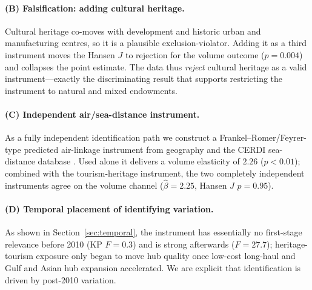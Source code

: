 \paragraph{(B) Falsification: adding cultural heritage.} Cultural heritage
co-moves with development and historic urban and manufacturing centres, so it
is a plausible exclusion-violator. Adding it as a third instrument moves the
Hansen $J$ to rejection for the volume outcome ($p=0.004$) and collapses the
point estimate. The data thus \emph{reject} cultural heritage as a valid
instrument---exactly the discriminating result that supports restricting the
instrument to natural and mixed endowments.

\paragraph{(C) Independent air/sea-distance instrument.} As a fully independent
identification path we construct a Frankel--Romer/Feyrer-type predicted
air-linkage instrument from geography and the CERDI sea-distance database
\citep{Frankel_1999,Feyrer_2019,Bertoli_2016}. Used alone it delivers a volume
elasticity of $2.26$ ($p<0.01$); combined with the tourism-heritage instrument,
the two completely independent instruments agree on the volume channel
($\hat\beta=2.25$, Hansen $J$ $p=0.95$).

\paragraph{(D) Temporal placement of identifying variation.} As shown in
Section~\ref{sec:temporal}, the instrument has essentially no first-stage
relevance before 2010 (KP $F=0.3$) and is strong afterwards ($F=27.7$);
heritage-tourism exposure only began to move hub quality once low-cost
long-haul and Gulf and Asian hub expansion accelerated. We are explicit that
identification is driven by post-2010 variation.

